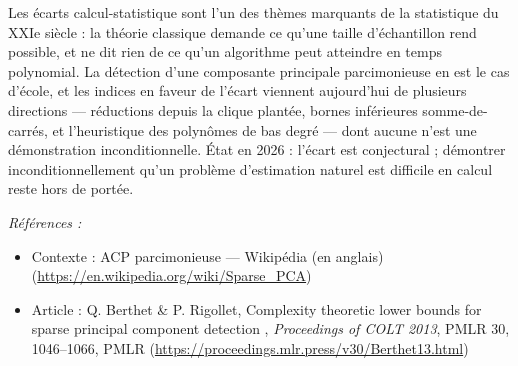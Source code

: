 \documentclass[11pt]{article}
\newenvironment{refs}{\par\small\noindent\emph{Références :}\begin{itemize}\setlength\itemsep{0pt}}{\end{itemize}\normalsize}
\begin{document}
\noindent Les écarts calcul-statistique sont l'un des thèmes marquants de la statistique
du XXIe siècle : la théorie classique demande ce qu'une taille d'échantillon rend
possible, et ne dit rien de ce qu'un algorithme peut atteindre en temps polynomial. La détection
d'une composante principale parcimonieuse en est le cas d'école, et les indices en faveur de
l'écart viennent aujourd'hui de plusieurs directions --- réductions depuis la clique plantée, bornes
inférieures somme-de-carrés, et l'heuristique des polynômes de bas degré --- dont aucune n'est une
démonstration inconditionnelle. État en 2026 : l'écart est conjectural ; démontrer
inconditionnellement qu'un problème d'estimation naturel est difficile en calcul reste hors de
portée.

\begin{refs}
\item Contexte : ACP parcimonieuse --- Wikipédia (en anglais) (\url{https://en.wikipedia.org/wiki/Sparse_PCA})
\item Article : Q. Berthet \& P. Rigollet, \og{} Complexity theoretic lower bounds for sparse principal component detection \fg{}, \textit{Proceedings of COLT 2013}, PMLR 30, 1046--1066, PMLR (\url{https://proceedings.mlr.press/v30/Berthet13.html})
\end{refs}

\bigskip
\end{document}
